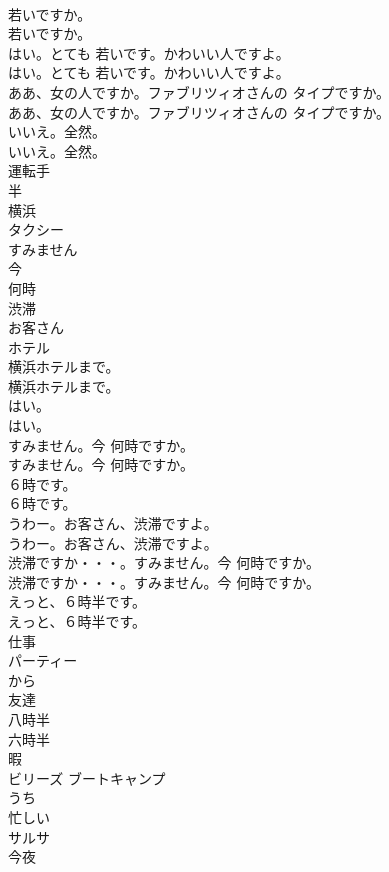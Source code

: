 \documentclass[8pt]{extreport}
\begin{document}
\begin{CJK}{UTF8}{min}
\\	若いですか。	
\\	若いですか。 
\\	はい。とても 若いです。かわいい人ですよ。	
\\	はい。とても 若いです。かわいい人ですよ。 
\\	ああ、女の人ですか。ファブリツィオさんの タイプですか。	
\\	ああ、女の人ですか。ファブリツィオさんの タイプですか。 
\\	いいえ。全然。	
\\	いいえ。全然。 
\\	運転手
\\	半
\\	横浜
\\	タクシー
\\	すみません
\\	今
\\	何時
\\	渋滞
\\	お客さん
\\	ホテル
\\	横浜ホテルまで。	
\\	横浜ホテルまで。 
\\	はい。	
\\	はい。 
\\	すみません。今 何時ですか。	
\\	すみません。今 何時ですか。 
\\	６時です。	
\\	６時です。 
\\	うわー。お客さん、渋滞ですよ。	
\\	うわー。お客さん、渋滞ですよ。 
\\	渋滞ですか・・・。すみません。今 何時ですか。	
\\	渋滞ですか・・・。すみません。今 何時ですか。 
\\	えっと、６時半です。	
\\	えっと、６時半です。 
\\	仕事
\\	パーティー
\\	から
\\	友達
\\	八時半
\\	六時半
\\	暇
\\	ビリーズ ブートキャンプ
\\	うち
\\	忙しい
\\	サルサ
\\	今夜

\end{CJK}
\end{document}
